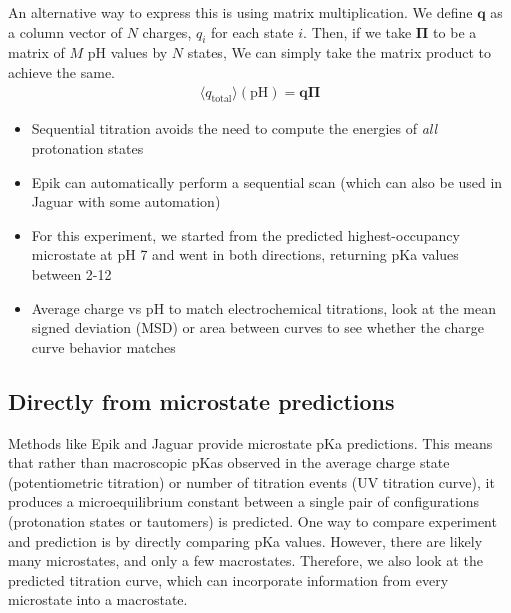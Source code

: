 \documentclass[9pt,lineno,final]{elife}
\newcommand{\pH}{\mathrm{pH}}
\begin{document}
An alternative way to express this is using matrix multiplication.
%
We define $\mathbf{q}$ as a column vector of $N$ charges, $q_i$ for each state $i$.
%
Then, if we take $\boldsymbol{\Pi}$ to be a matrix of $M$ pH values by $N$ states,
%
We can simply take the matrix product to achieve the same.
\begin{align}
    \langle q_\text{total} \rangle (\pH) = \mathbf{q} \boldsymbol{\Pi} 
\end{align}




\begin{itemize}
	\item Sequential titration avoids the need to compute the energies of \emph{all} protonation states
	\item Epik can automatically perform a sequential scan (which can also be used in Jaguar with some automation)
	\item For this experiment, we started from the predicted highest-occupancy microstate at pH 7 and went in both directions, returning pKa values between 2-12
	\item Average charge vs pH to match electrochemical titrations, look at the mean signed deviation (MSD) or area between curves to see whether the charge curve behavior matches
\end{itemize}

\subsection{Directly from microstate predictions}

Methods like Epik and Jaguar provide microstate pKa predictions.
%
This means that rather than macroscopic pKas observed in the average charge state (potentiometric titration) or number of titration events (UV titration curve), it produces a microequilibrium constant between a single pair of configurations (protonation states or tautomers) is predicted. 
%
One way to compare experiment and prediction is by directly comparing 
pKa values.
%
However, there are likely many microstates, and only a few macrostates.
%
Therefore, we also look at the predicted titration curve, which can incorporate information from every microstate into a macrostate.
\end{document}
